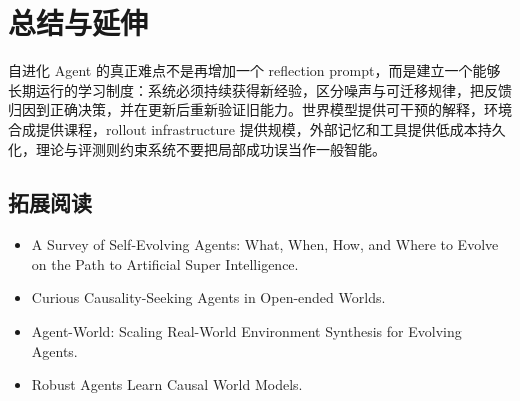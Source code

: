 \section{总结与延伸}

自进化 Agent 的真正难点不是再增加一个 reflection prompt，而是建立一个能够长期运行的学习制度：系统必须持续获得新经验，区分噪声与可迁移规律，把反馈归因到正确决策，并在更新后重新验证旧能力。世界模型提供可干预的解释，环境合成提供课程，rollout infrastructure 提供规模，外部记忆和工具提供低成本持久化，理论与评测则约束系统不要把局部成功误当作一般智能。

\subsection{拓展阅读}

\begin{itemize}
    \item A Survey of Self-Evolving Agents: What, When, How, and Where to Evolve on the Path to Artificial Super Intelligence.
    \item Curious Causality-Seeking Agents in Open-ended Worlds.
    \item Agent-World: Scaling Real-World Environment Synthesis for Evolving Agents.
    \item Robust Agents Learn Causal World Models.
\end{itemize}


